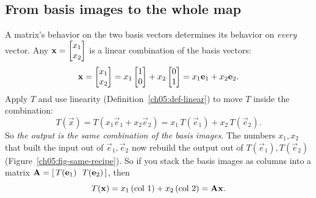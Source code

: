 \subsection{From basis images to the whole map}

A matrix's behavior on the two basis vectors determines its
behavior on \emph{every} vector. Any $\mathbf{x} = \begin{bmatrix}x_1\\x_2\end{bmatrix}$ is a linear
combination of the basis vectors:
\[
  \mathbf{x} = \begin{bmatrix}x_1\\x_2\end{bmatrix} = x_1\begin{bmatrix}1\\0\end{bmatrix} + x_2\begin{bmatrix}0\\1\end{bmatrix}
          = x_1\mathbf{e}_1 + x_2\mathbf{e}_2.
\]
Apply $T$ and use linearity (Definition~\ref{ch05:def-linear}) to move $T$
inside the combination:
\[
  T(\vec{x}) = T(x_1\vec{e}_1 + x_2\vec{e}_2)
             = x_1\,T(\vec{e}_1) + x_2\,T(\vec{e}_2).
\]
So \emph{the output is the same combination of the
basis images}. The numbers $x_1, x_2$ that built the input out of $\vec{e}_1,
\vec{e}_2$ now rebuild the output out of $T(\vec{e}_1), T(\vec{e}_2)$
(Figure~\ref{ch05:fig-same-recipe}). So if you
stack the basis images as columns into a matrix $\mathbf{A} =
[\,T(\mathbf{e}_1)\ \ T(\mathbf{e}_2)\,]$, then
\[
  T(\mathbf{x}) = x_1\,(\text{col }1) + x_2\,(\text{col }2) = \mathbf{A}\mathbf{x}.
\]

